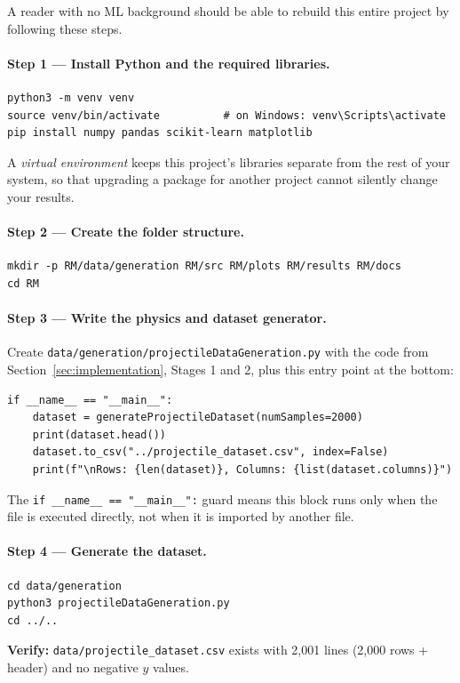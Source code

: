 \documentclass[11pt,a4paper]{article}
\begin{document}
A reader with no ML background should be able to rebuild this entire project by following these
steps.

\paragraph{Step 1 --- Install Python and the required libraries.}
\begin{lstlisting}[style=shellstyle,numbers=none]
python3 -m venv venv
source venv/bin/activate          # on Windows: venv\Scripts\activate
pip install numpy pandas scikit-learn matplotlib
\end{lstlisting}
A \emph{virtual environment} keeps this project's libraries separate from the rest of your system, so
that upgrading a package for another project cannot silently change your results.

\paragraph{Step 2 --- Create the folder structure.}
\begin{lstlisting}[style=shellstyle,numbers=none]
mkdir -p RM/data/generation RM/src RM/plots RM/results RM/docs
cd RM
\end{lstlisting}

\paragraph{Step 3 --- Write the physics and dataset generator.}
Create \texttt{data/generation/projectileDataGeneration.py} with the code from
Section~\ref{sec:implementation}, Stages 1 and 2, plus this entry point at the bottom:
\begin{lstlisting}[numbers=none]
if __name__ == "__main__":
    dataset = generateProjectileDataset(numSamples=2000)
    print(dataset.head())
    dataset.to_csv("../projectile_dataset.csv", index=False)
    print(f"\nRows: {len(dataset)}, Columns: {list(dataset.columns)}")
\end{lstlisting}
The \texttt{if \_\_name\_\_ == "\_\_main\_\_":} guard means this block runs only when the file is
executed directly, not when it is imported by another file.

\paragraph{Step 4 --- Generate the dataset.}
\begin{lstlisting}[style=shellstyle,numbers=none]
cd data/generation
python3 projectileDataGeneration.py
cd ../..
\end{lstlisting}
\textbf{Verify:} \texttt{data/projectile\_dataset.csv} exists with 2{,}001 lines
(2{,}000 rows + header) and no negative $y$ values.
\end{document}
